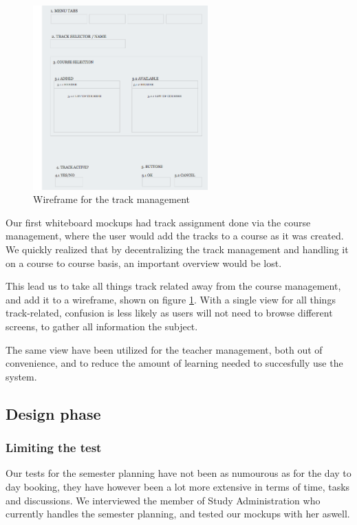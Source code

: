 \begin{figure}[htb]
\begin{center}
\leavevmode
\includegraphics[width=0.6\textwidth]{images/wireframe_tracks}
\end{center}
\caption{Wireframe for the track management}
\label{fig:wireframe_tracks}
\end{figure}

Our first whiteboard mockups had track assignment done via the course management, where the user would add the tracks to a course as it was created. We quickly realized that by decentralizing the track management and handling it on a course to course basis, an important overview would be lost.

This lead us to take all things track related away from the course management, and add it to a wireframe, shown on figure \ref{fig:wireframe_tracks}. With a single view for all things track-related, confusion is less likely as users will not need to browse different screens, to gather all information the subject\cite{lauesen}.

The same view have been utilized for the teacher management, both out of convenience, and to reduce the amount of learning needed to succesfully use the system.


\subsection{Design phase}
\label{subsec:design_phase_sem}
\subsubsection{Limiting the test}
Our tests for the semester planning have not been as numourous as for the day to day booking, they have however been a lot more extensive in terms of time, tasks and discussions.
We interviewed the member of Study Administration who currently handles the semester planning, and tested our mockups with her aswell.

